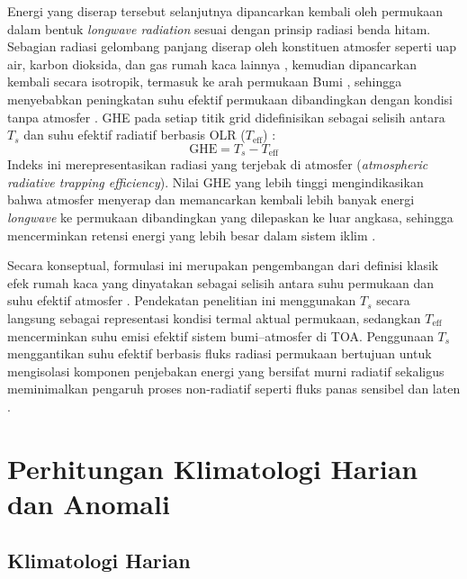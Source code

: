 \documentclass[12pt,a4paper]{report}
\begin{document}
Energi yang diserap tersebut selanjutnya dipancarkan kembali oleh permukaan
dalam bentuk \textit{longwave radiation} sesuai dengan prinsip radiasi benda
hitam. Sebagian radiasi gelombang panjang diserap oleh konstituen atmosfer
seperti uap air, karbon dioksida, dan gas rumah kaca lainnya
\cite{teixeira2024}, kemudian dipancarkan kembali secara isotropik, termasuk ke
arah permukaan Bumi \cite{wang2023}, sehingga menyebabkan peningkatan suhu
efektif permukaan dibandingkan dengan kondisi tanpa atmosfer \cite{feng2023}.
GHE pada setiap titik grid didefinisikan sebagai selisih antara
$T_s$ dan suhu efektif radiatif berbasis OLR ($T_{\mathrm{eff}}$)
\cite{Raval1989,Aires2003}:
%
\begin{equation}
  \mathrm{GHE} = T_s - T_{\mathrm{eff}}
  \label{eq:ghe}
\end{equation}
%
Indeks ini merepresentasikan radiasi yang terjebak di atmosfer
(\textit{atmospheric radiative trapping efficiency}). Nilai GHE yang lebih
tinggi mengindikasikan bahwa atmosfer menyerap dan memancarkan kembali lebih
banyak energi \textit{longwave} ke permukaan dibandingkan yang dilepaskan ke
luar angkasa, sehingga mencerminkan retensi energi yang lebih besar dalam
sistem iklim \cite{Aires2003}.
 
Secara konseptual, formulasi ini merupakan pengembangan dari definisi klasik
efek rumah kaca yang dinyatakan sebagai selisih antara suhu permukaan dan suhu
efektif atmosfer \cite{Raval1989}. Pendekatan penelitian ini menggunakan $T_s$
secara langsung sebagai representasi kondisi termal aktual permukaan, sedangkan
$T_{\mathrm{eff}}$ mencerminkan suhu emisi efektif sistem bumi--atmosfer di
TOA. Penggunaan $T_s$ menggantikan suhu efektif berbasis fluks radiasi
permukaan bertujuan untuk mengisolasi komponen penjebakan energi yang bersifat
murni radiatif sekaligus meminimalkan pengaruh proses non-radiatif seperti
fluks panas sensibel dan laten \cite{Kiehl1997}.
 


\section{Perhitungan Klimatologi Harian dan Anomali}
 
\subsection{Klimatologi Harian}
 
\end{document}
